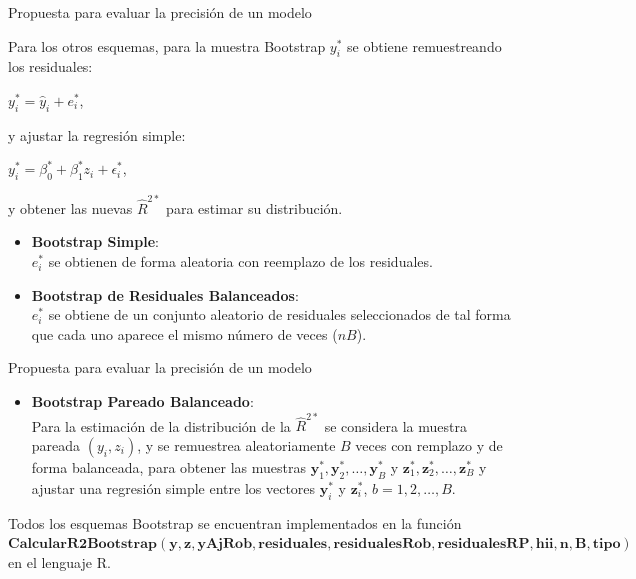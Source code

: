 \documentclass[serif, aspectratio=169]{beamer}
\begin{document}
\begin{frame}{Propuesta para evaluar la precisión de un modelo}
	
	Para los otros esquemas, para la muestra Bootstrap $y^{*}_{i}$ se obtiene remuestreando los residuales:
	
	\begin{center}
		{\large$ y^{*}_{i} = \hat{y}_{i} + e^{*}_{i}$},
	\end{center}
	
	y ajustar la regresión simple:
	\begin{center}
		$y^{*}_{i} = \beta_0^{*} + \beta_1^{*} z_i + \epsilon_i^{*} $,
	\end{center}
	
	y obtener las nuevas $\hat{R}^{2*}$ para estimar su distribución.
	
	\begin{itemize}
		
		\item \textbf{Bootstrap Simple}:\\
		$e^{*}_{i}$ se obtienen de forma aleatoria con reemplazo de los residuales.
		
		\item \textbf{Bootstrap de Residuales Balanceados}:\\
		$e^{*}_{i}$ se obtiene de un conjunto aleatorio de residuales seleccionados de tal forma que cada uno aparece el mismo número de veces ($nB$).
		
	\end{itemize}
	
\end{frame}


\begin{frame}{Propuesta para evaluar la precisión de un modelo}
	
	\begin{itemize}
		\item \textbf{Bootstrap Pareado Balanceado}:\\
		
		Para la estimación de la distribución de la $\hat{R}^{2*}$ se considera la muestra pareada $(y_i, z_i)$, y se remuestrea aleatoriamente $B$ veces con remplazo y de forma balanceada, para obtener las muestras \( \mathbf{y}_{1}^{*}, \mathbf{y}_{2}^{*}, \dots, \mathbf{y}_{B}^{*} \) y \( \mathbf{z}_{1}^{*}, \mathbf{z}_{2}^{*}, \dots, \mathbf{z}_{B}^{*} \) y ajustar una regresión simple entre los vectores \( \mathbf{y}^{*}_{i} \) y \( \mathbf{z}_{i}^{*} \), \( b = 1, 2, \dots, B \).
	\end{itemize}
	\vspace{.3cm}
	
	Todos los esquemas Bootstrap se encuentran implementados en la función $\mathbf{CalcularR2Bootstrap(y, z, yAjRob, residuales, residualesRob, residualesRP, hii, n, B, tipo)}$ en el lenguaje R.
\end{frame}
\end{document}
